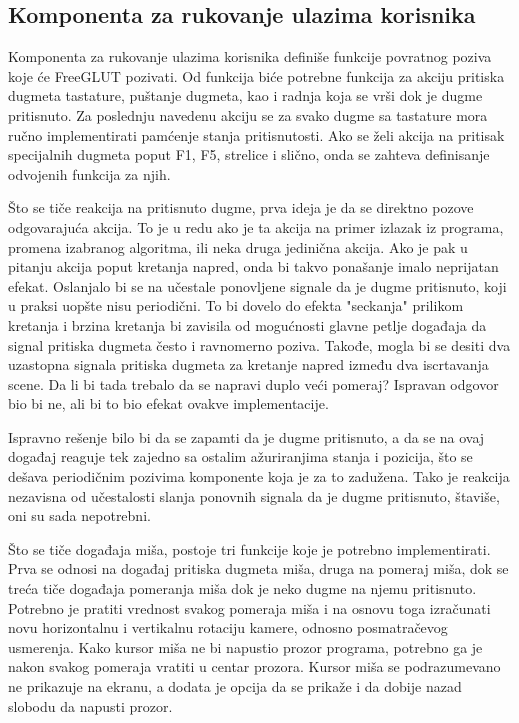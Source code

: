 \documentclass[12pt,oneside]{memoir}
\begin{document}
\subsection{Komponenta za rukovanje ulazima korisnika}

Komponenta za rukovanje ulazima korisnika definiše funkcije povratnog poziva koje će FreeGLUT pozivati.
Od funkcija biće potrebne funkcija za akciju pritiska dugmeta tastature, puštanje dugmeta, kao i 
radnja koja se vrši dok je dugme pritisnuto. 
Za poslednju navedenu akciju se za svako dugme sa tastature mora ručno implementirati pamćenje stanja pritisnutosti.
Ako se želi akcija na pritisak specijalnih dugmeta  
poput F1, F5, strelice i slično, onda se zahteva definisanje odvojenih funkcija za njih.

Što se tiče reakcija na pritisnuto dugme, prva ideja je da se direktno pozove odgovarajuća akcija. 
To je u redu ako je ta akcija na primer izlazak iz programa, promena izabranog algoritma, ili neka druga jedinična akcija.
Ako je pak u pitanju akcija poput kretanja napred, onda bi takvo ponašanje imalo neprijatan efekat. 
Oslanjalo bi se na učestale ponovljene signale da je dugme pritisnuto, koji u praksi uopšte nisu periodični.
To bi dovelo do efekta "seckanja" prilikom kretanja i brzina kretanja bi zavisila od mogućnosti glavne petlje događaja da signal pritiska dugmeta često i ravnomerno poziva.
Takođe, mogla bi se desiti  dva uzastopna signala pritiska dugmeta za kretanje napred između dva iscrtavanja scene. 
Da li bi tada trebalo da se napravi duplo veći pomeraj?
Ispravan odgovor bio bi ne, ali bi to bio efekat ovakve implementacije.

Ispravno rešenje bilo bi da se zapamti da je dugme pritisnuto,  a da se na ovaj događaj reaguje  tek zajedno sa ostalim ažuriranjima 
stanja i pozicija, što se dešava periodičnim pozivima komponente koja je za to zadužena. Tako je reakcija nezavisna od učestalosti 
slanja ponovnih signala da je dugme pritisnuto, štaviše, oni su sada nepotrebni. 

Što se tiče događaja miša, postoje tri funkcije koje je potrebno implementirati. Prva se odnosi na događaj pritiska 
dugmeta miša, druga na pomeraj miša, dok se treća tiče događaja pomeranja miša dok je neko dugme na njemu pritisnuto.
Potrebno je pratiti vrednost svakog pomeraja miša i na osnovu toga izračunati novu horizontalnu i vertikalnu rotaciju 
kamere, odnosno posmatračevog usmerenja.
Kako kursor miša ne bi napustio prozor programa, 
potrebno ga je nakon svakog pomeraja vratiti u centar prozora.
Kursor miša se podrazumevano ne prikazuje na ekranu, a dodata je opcija da se prikaže i da dobije nazad slobodu da napusti prozor.
\end{document}

